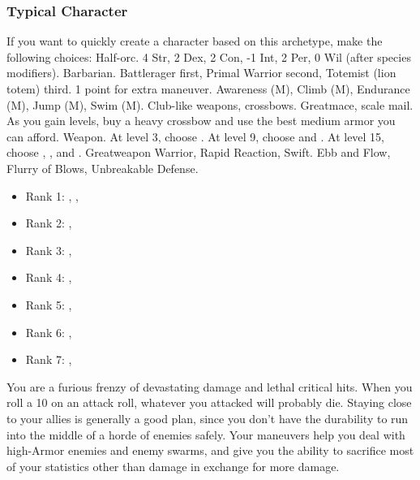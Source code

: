        \subsubsection{Typical Character}
            If you want to quickly create a character based on this archetype, make the following choices:
             Half-orc.
             4 Str, 2 Dex, 2 Con, -1 Int, 2 Per, 0 Wil (after species modifiers).
             Barbarian.
             Battlerager first, Primal Warrior second, Totemist (lion totem) third.
             1 point for extra maneuver.
             Awareness (M), Climb (M), Endurance (M), Jump (M), Swim (M).
             Club-like weapons, crossbows.
             Greatmace, scale mail. As you gain levels, buy a heavy crossbow and use the best medium armor you can afford.
             Weapon.
                At level 3, choose .
                At level 9, choose  and .
                At level 15, choose , , and .
             Greatweapon Warrior, Rapid Reaction, Swift.
             Ebb and Flow, Flurry of Blows, Unbreakable Defense.
            \begin{itemize}
                \item Rank 1: , , 
                \item Rank 2: , 
                \item Rank 3: , 
                \item Rank 4: , 
                \item Rank 5: , 
                \item Rank 6: , 
                \item Rank 7: , 
            \end{itemize}
             You are a furious frenzy of devastating damage and lethal critical hits.
            When you roll a 10 on an attack roll, whatever you attacked will probably die.
            Staying close to your allies is generally a good plan, since you don't have the durability to run into the middle of a horde of enemies safely.
            Your maneuvers help you deal with high-Armor enemies and enemy swarms, and give you the ability to sacrifice most of your statistics other than damage in exchange for more damage.

